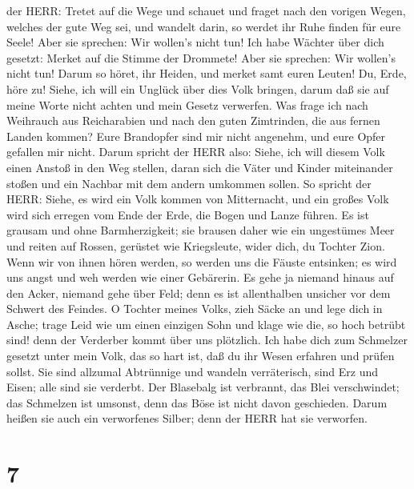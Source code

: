 der HERR: Tretet auf die Wege und schauet und fraget nach den vorigen
Wegen, welches der gute Weg sei, und wandelt darin, so werdet ihr Ruhe
finden für eure Seele! Aber sie sprechen: Wir wollen's nicht tun!
 Ich habe Wächter über dich gesetzt: Merket auf die Stimme
der Drommete! Aber sie sprechen: Wir wollen's nicht tun! 
Darum so höret, ihr Heiden, und merket samt euren Leuten! 
Du, Erde, höre zu! Siehe, ich will ein Unglück über dies Volk bringen,
darum daß sie auf meine Worte nicht achten und mein Gesetz verwerfen.
 Was frage ich nach Weihrauch aus Reicharabien und nach den
guten Zimtrinden, die aus fernen Landen kommen? Eure Brandopfer sind mir
nicht angenehm, und eure Opfer gefallen mir nicht.  Darum
spricht der HERR also: Siehe, ich will diesem Volk einen Anstoß in den
Weg stellen, daran sich die Väter und Kinder miteinander stoßen und ein
Nachbar mit dem andern umkommen sollen.  So spricht der
HERR: Siehe, es wird ein Volk kommen von Mitternacht, und ein großes
Volk wird sich erregen vom Ende der Erde,  die Bogen und
Lanze führen. Es ist grausam und ohne Barmherzigkeit; sie brausen daher
wie ein ungestümes Meer und reiten auf Rossen, gerüstet wie Kriegsleute,
wider dich, du Tochter Zion.  Wenn wir von ihnen hören
werden, so werden uns die Fäuste entsinken; es wird uns angst und weh
werden wie einer Gebärerin.  Es gehe ja niemand hinaus auf
den Acker, niemand gehe über Feld; denn es ist allenthalben unsicher vor
dem Schwert des Feindes.  O Tochter meines Volks, zieh
Säcke an und lege dich in Asche; trage Leid wie um einen einzigen Sohn
und klage wie die, so hoch betrübt sind! denn der Verderber kommt über
uns plötzlich.  Ich habe dich zum Schmelzer gesetzt unter
mein Volk, das so hart ist, daß du ihr Wesen erfahren und prüfen sollst.
 Sie sind allzumal Abtrünnige und wandeln verräterisch,
sind Erz und Eisen; alle sind sie verderbt.  Der Blasebalg
ist verbrannt, das Blei verschwindet; das Schmelzen ist umsonst, denn
das Böse ist nicht davon geschieden.  Darum heißen sie auch
ein verworfenes Silber; denn der HERR hat sie verworfen.

\hypertarget{section-6}{%
\section{7}\label{section-6}}

